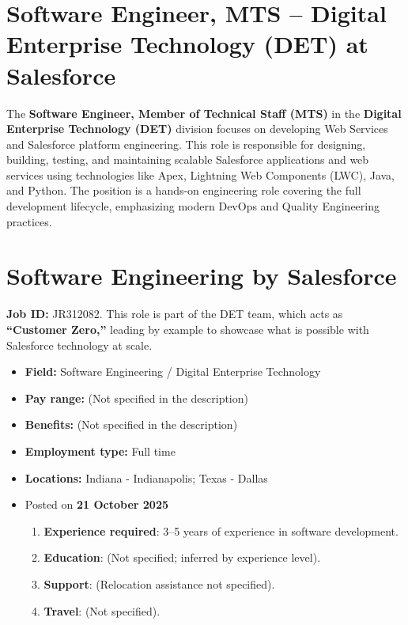 \documentclass[11pt]{article}
\begin{document}



\section*{Software Engineer, MTS – Digital Enterprise Technology (DET) at Salesforce}

The \textbf{Software Engineer, Member of Technical Staff (MTS)} in the 
\textbf{Digital Enterprise Technology (DET)} division focuses on developing 
Web Services and Salesforce platform engineering. This role is responsible 
for designing, building, testing, and maintaining scalable Salesforce 
applications and web services using technologies like Apex, Lightning Web 
Components (LWC), Java, and Python. The position is a hands-on engineering 
role covering the full development lifecycle, emphasizing modern DevOps and 
Quality Engineering practices.

\section*{Software Engineering by \textbf{Salesforce}}
\textbf{Job ID:} JR312082. This role is part of the DET team, which acts as 
\textbf{``Customer Zero,''} leading by example to showcase what is possible 
with Salesforce technology at scale.

\begin{itemize}
  \item \textbf{Field:} Software Engineering / Digital Enterprise Technology
  \item \textbf{Pay range:} (Not specified in the description)
  \item \textbf{Benefits:} (Not specified in the description)
  \item \textbf{Employment type:} Full time
  \item \textbf{Locations:} Indiana - Indianapolis; Texas - Dallas
  \item Posted on \textbf{21 October 2025}
  \begin{enumerate}[label=\arabic*., leftmargin=*]
    \item \textbf{Experience required}: 3–5 years of experience in software 
      development.
    \item \textbf{Education}: (Not specified; inferred by experience level).
    \item \textbf{Support}: (Relocation assistance not specified).
    \item \textbf{Travel}: (Not specified).
  \end{enumerate}
\end{itemize}
\end{document}

